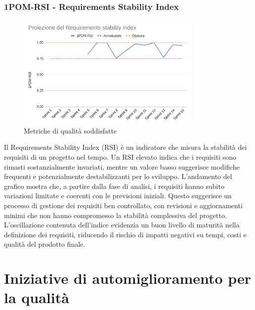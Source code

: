 \documentclass{article}
\begin{document}
        \subsubsection{1POM-RSI - Requirements Stability Index}
        \begin{figure}[H]
            \centering
            \includegraphics[width=0.8\textwidth]{../../../img/pdq_charts/chart7-proiezioneRSI.png}
            \caption{Metriche di qualità soddisfatte}
        \end{figure}
        Il Requirements Stability Index (RSI) è un indicatore che misura la stabilità dei requisiti di un progetto nel tempo. Un RSI elevato indica che i requisiti sono rimasti sostanzialmente invariati, mentre un valore basso suggerisce modifiche frequenti e potenzialmente destabilizzanti per lo sviluppo.
        L’andamento del grafico mostra che, a partire dalla fase di analisi, i requisiti hanno subito variazioni limitate e coerenti con le previsioni iniziali. Questo suggerisce un processo di gestione dei requisiti ben controllato, con revisioni e aggiornamenti minimi che non hanno compromesso la stabilità complessiva del progetto.
        L’oscillazione contenuta dell’indice evidenzia un buon livello di maturità nella definizione dei requisiti, riducendo il rischio di impatti negativi su tempi, costi e qualità del prodotto finale.


\newpage
\section{Iniziative di automiglioramento per la qualità}
\end{document}
